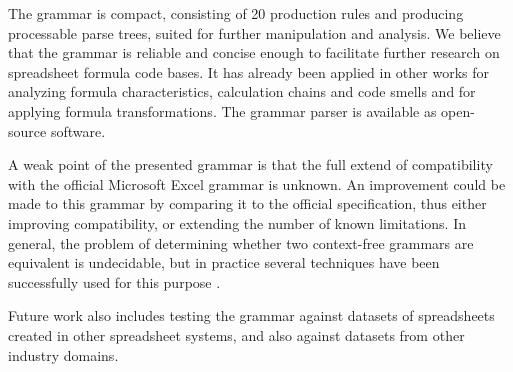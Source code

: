 \documentclass[conference]{IEEEtran}
\begin{document}
The grammar is compact, consisting of 20 production rules and producing processable parse trees, suited for further manipulation and analysis. We believe that the grammar is reliable and concise enough to facilitate further research on spreadsheet formula code bases. It has already been applied in other works for analyzing formula characteristics, calculation chains and code smells and for applying formula transformations. The grammar parser is available as open-source software.

A weak point of the presented grammar is that the full extend of compatibility with the official Microsoft Excel grammar is unknown.
An improvement could be made to this grammar by comparing it to the official specification, thus either improving compatibility, or extending the number of known limitations.
In general, the problem of determining whether two context-free grammars are equivalent is undecidable, but in practice several techniques have been successfully used for this purpose \cite{lammel2009introduction,fischer2012comparison}.

Future work also includes testing the grammar against datasets of spreadsheets created in other spreadsheet systems, and also against datasets from other industry domains.




\end{document}
